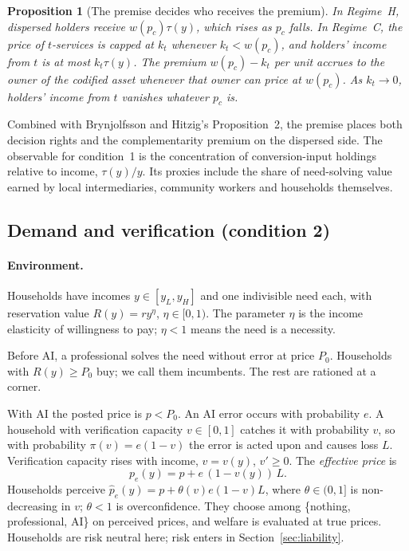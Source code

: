 \documentclass[12pt]{article}
\newtheorem{proposition}{Proposition}
\theoremstyle{remark}
\begin{document}
\begin{proposition}[The premise decides who receives the premium]\label{prop:regime}
In Regime~H, dispersed holders receive $w(p_c)\tau(y)$, which rises as $p_c$ falls. In Regime~C, the price of $t$-services is capped at $k_t$ whenever $k_t<w(p_c)$, and holders' income from $t$ is at most $k_t\tau(y)$. The premium $w(p_c)-k_t$ per unit accrues to the owner of the codified asset whenever that owner can price at $w(p_c)$. As $k_t\to0$, holders' income from $t$ vanishes whatever $p_c$ is.
\end{proposition}

Combined with Brynjolfsson and Hitzig's Proposition~2, the premise places both decision rights and the complementarity premium on the dispersed side. The observable for condition~1 is the concentration of conversion-input holdings relative to income, $\tau(y)/y$. Its proxies include the share of need-solving value earned by local intermediaries, community workers and households themselves.

\subsection{Demand and verification (condition 2)}\label{sec:verification}

\paragraph{Environment.} Households have incomes $y\in[y_L,y_H]$ and one indivisible need each, with reservation value $R(y)=ry^\eta$, $\eta\in[0,1)$. The parameter $\eta$ is the income elasticity of willingness to pay; $\eta<1$ means the need is a necessity.

Before AI, a professional solves the need without error at price $P_0$. Households with $R(y)\ge P_0$ buy; we call them incumbents. The rest are rationed at a corner.

With AI the posted price is $p<P_0$. An AI error occurs with probability $e$. A household with verification capacity $v\in[0,1]$ catches it with probability $v$, so with probability $\pi(v)=e(1-v)$ the error is acted upon and causes loss $L$. Verification capacity rises with income, $v=v(y)$, $v'\ge0$. The \emph{effective price} is
\begin{equation}
p_e(y)=p+e\,(1-v(y))\,L .
\end{equation}
Households perceive $\hat p_e(y)=p+\theta(v)e(1-v)L$, where $\theta\in(0,1]$ is non-decreasing in $v$; $\theta<1$ is overconfidence. They choose among \{nothing, professional, AI\} on perceived prices, and welfare is evaluated at true prices. Households are risk neutral here; risk enters in Section~\ref{sec:liability}.
\end{document}
